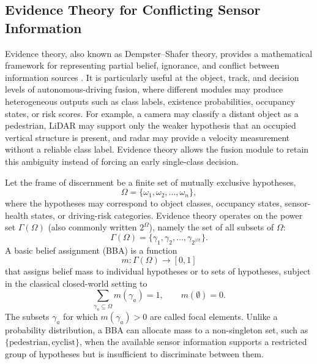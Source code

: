 \documentclass{ieeeaccess}
\newcommand{\added}[1]{\textcolor{RevisionBlue}{#1}}
\begin{document}
\subsection{Evidence Theory for Conflicting Sensor Information}

Evidence theory, also known as Dempster--Shafer theory, provides a mathematical framework for representing partial belief, ignorance, and conflict between information sources \cite{shafer_mathematical_1976,dempster_upperlower_2008,smets_transferable_1990}. It is particularly useful at the object, track, and decision levels of autonomous-driving fusion, where different modules may produce heterogeneous outputs such as class labels, existence probabilities, occupancy states, or risk scores. For example, a camera may classify a distant object as a pedestrian, LiDAR may support only the weaker hypothesis that an occupied vertical structure is present, and radar may provide a velocity measurement without a reliable class label. Evidence theory allows the fusion module to retain this ambiguity instead of forcing an early single-class decision.

Let the frame of discernment be a finite set of mutually exclusive hypotheses,
\begin{equation}
\Omega = \{\omega_1, \omega_2, \ldots, \omega_n\},
\end{equation}
where the hypotheses may correspond to object classes, occupancy states, sensor-health states, or driving-risk categories. Evidence theory operates on the power set \(\Gamma(\Omega)\) \added{(also commonly written $2^{\Omega}$)}, namely the set of all subsets of \(\Omega\):
\begin{equation}
\Gamma(\Omega) = \{\gamma_1, \gamma_2, \ldots, \gamma_{2^{|\Omega|}}\}.
\end{equation}
A basic belief assignment (BBA) is a function
\begin{equation}
m: \Gamma(\Omega) \rightarrow [0,1]
\end{equation}
that assigns belief mass to individual hypotheses or to sets of hypotheses, subject in the classical closed-world setting to
\begin{equation}
\sum_{\gamma_a \subseteq \Omega} m(\gamma_a)=1, \qquad m(\emptyset)=0.
\label{eq:bba}
\end{equation}
The subsets \(\gamma_a\) for which \(m(\gamma_a)>0\) are called focal elements. Unlike a probability distribution, a BBA can allocate mass to a non-singleton set, such as \(\{\text{pedestrian},\text{cyclist}\}\), when the available sensor information supports a restricted group of hypotheses but is insufficient to discriminate between them.
\end{document}
